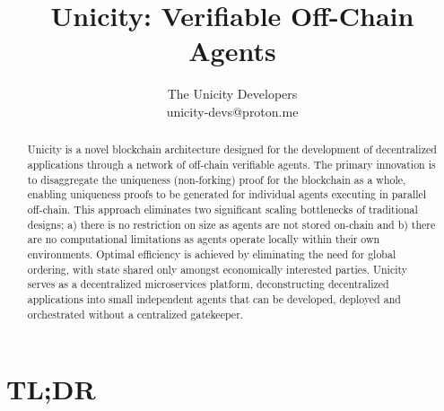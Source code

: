 \documentclass{article}
\title{Unicity: Verifiable Off-Chain Agents}
\author{The Unicity Developers\\unicity-devs@proton.me}
\date{}
\begin{document}
\maketitle

\begin{abstract}

Unicity is a novel blockchain architecture designed for the development of decentralized applications through a network of off-chain verifiable agents. The primary innovation is to disaggregate the uniqueness (non-forking) proof for the blockchain as a whole, enabling uniqueness proofs to be generated for individual agents executing in parallel off-chain. This approach eliminates two significant scaling bottlenecks of traditional designs; a) there is no restriction on size as agents are not stored on-chain and b) there are no computational limitations as agents operate locally within their own environments. Optimal efficiency is achieved by eliminating the need for global ordering, with state shared only amongst economically interested parties. Unicity serves as a decentralized microservices platform, deconstructing decentralized applications into small independent agents that can be developed, deployed and orchestrated without a centralized gatekeeper.

\end{abstract}


\section*{TL;DR}
\end{document}
